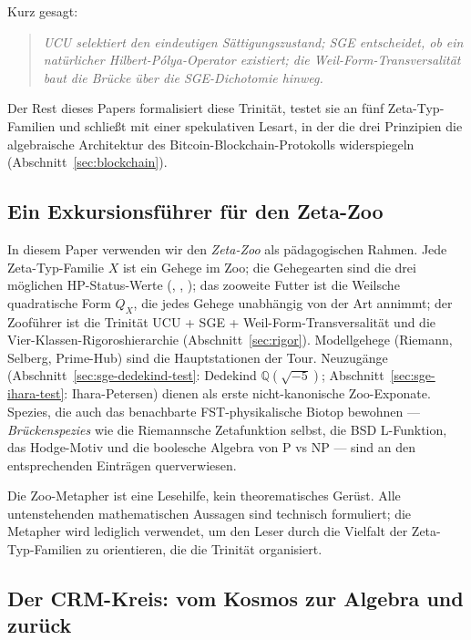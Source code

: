 \documentclass[11pt]{article}
\theoremstyle{definition}
\theoremstyle{remark}
\begin{document}
Kurz gesagt:

\begin{quote}
\emph{UCU selektiert den eindeutigen Sättigungszustand; SGE entscheidet, ob
ein natürlicher Hilbert-P\'olya-Operator existiert; die Weil-Form-Transversalität
baut die Brücke über die SGE-Dichotomie hinweg.}
\end{quote}

Der Rest dieses Papers formalisiert diese Trinität, testet sie an
fünf Zeta-Typ-Familien und schließt mit einer spekulativen Lesart, in der
die drei Prinzipien die algebraische Architektur des Bitcoin-Blockchain-Protokolls
widerspiegeln (Abschnitt~\ref{sec:blockchain}).

\subsection{Ein Exkursionsführer für den Zeta-Zoo}
\label{sec:zoo-framing}

In diesem Paper verwenden wir den \emph{Zeta-Zoo} als pädagogischen
Rahmen. Jede Zeta-Typ-Familie $X$ ist ein Gehege im Zoo; die Gehegearten sind die drei möglichen
HP-Status-Werte (, , ); das zooweite Futter ist die
Weilsche quadratische Form $Q_X$, die jedes Gehege unabhängig von der Art annimmt;
der Zooführer ist die Trinität UCU + SGE + Weil-Form-Transversalität und die
Vier-Klassen-Rigoroshierarchie (Abschnitt~\ref{sec:rigor}). Modellgehege (Riemann,
Selberg, Prime-Hub) sind die Hauptstationen der Tour. Neuzugänge
(Abschnitt~\ref{sec:sge-dedekind-test}: Dedekind $\mathbb{Q}(\sqrt{-5})$;
Abschnitt~\ref{sec:sge-ihara-test}: Ihara-Petersen) dienen als erste nicht-kanonische Zoo-Exponate.
Spezies, die auch das benachbarte FST-physikalische Biotop
\cite{RFEPFramework} bewohnen --- \emph{Brückenspezies} wie die Riemannsche Zetafunktion selbst,
die BSD L-Funktion, das Hodge-Motiv und die boolesche Algebra von P vs NP ---
sind an den entsprechenden Einträgen querverwiesen.

Die Zoo-Metapher ist eine Lesehilfe, kein theorematisches Gerüst. Alle
untenstehenden mathematischen Aussagen sind technisch formuliert; die
Metapher wird lediglich verwendet, um den Leser durch die Vielfalt der Zeta-Typ-Familien
zu orientieren, die die Trinität organisiert.

\subsection{Der CRM-Kreis: vom Kosmos zur Algebra und zurück}
\label{sec:crm-circle}
\end{document}
